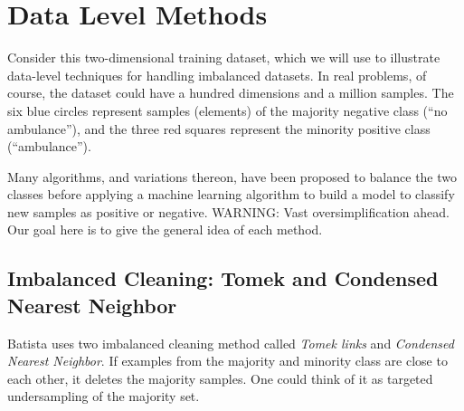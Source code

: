 \section{Data Level Methods}

Consider this two-dimensional training dataset, which we will use to illustrate data-level techniques for handling imbalanced datasets.  In real problems, of course, the dataset could have a hundred dimensions and a million samples.  The six blue circles represent samples (elements) of the majority negative class (``no ambulance''), and the three red squares represent the minority positive class (``ambulance'').  


\begin{center}
\end{center}

Many algorithms, and variations thereon, have been proposed to balance the two classes before applying a machine learning algorithm to build a model to classify new samples as positive or negative.  WARNING:  Vast oversimplification ahead.  Our goal here is to give the general idea of each method.  


\subsection{Imbalanced Cleaning:  Tomek and Condensed Nearest Neighbor}

Batista
\cite{BATISTA_2004}
uses two imbalanced cleaning method called {\it Tomek links} and {\it Condensed Nearest Neighbor}.  If examples from the majority and minority class are close to each other, it deletes the majority samples.   One could think of it as targeted undersampling of the majority set.  

